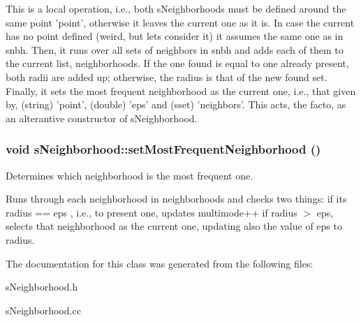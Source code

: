 This is a local operation, i.e., both s\-Neighborhoods must be defined around the same point 'point', otherwise it leaves the current one as it is. In case the current has no point defined (weird, but lets consider it) it assumes the same one as in snbh. Then, it runs over all sets of neighbors in snbh and adds each of them to the current list, neighborhoods. If the one found is equal to one already present, both radii are added up; otherwise, the radius is that of the new found set. Finally, it sets the most frequent neighborhood as the current one, i.e., that given by, (string) 'point', (double) 'eps' and (sset) 'neighbors'. This acts, the facto, as an alterantive constructor of s\-Neighborhood.
\subsubsection{\setlength{\rightskip}{0pt plus 5cm}void s\-Neighborhood::set\-Most\-Frequent\-Neighborhood ()}\label{classsNeighborhood_a2}


Determines which neighborhood is the most frequent one. 

Runs through each neighborhood in neighborhoods and checks two things: if its radius == eps , i.e., to present one, updates multimode++ if radius $>$ eps, selects that neighborhood as the current one, updating also the value of eps to radius.

The documentation for this class was generated from the following files:\begin{CompactItemize}
\item 
s\-Neighborhood.h\item 
s\-Neighborhood.cc\end{CompactItemize}
